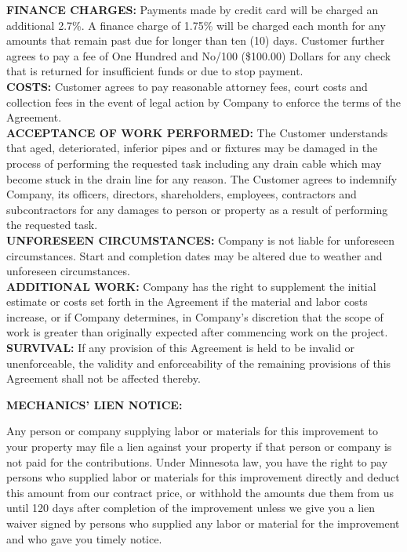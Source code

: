 \documentclass{article}
\begin{document}
\begin{footnotesize}
\noindent \textbf{FINANCE CHARGES:} Payments made by credit card will be charged an additional 2.7\%. A finance charge of 1.75\% will be charged each month for any amounts that remain past due for longer than ten (10) days. Customer further agrees to pay a fee of One Hundred and No/100 (\$100.00) Dollars for any check that is returned for insufficient funds or due to stop payment. \\

\noindent \textbf{COSTS:} Customer agrees to pay reasonable attorney fees, court costs and collection fees in the event of legal action by Company to enforce the terms of the Agreement. \\

\noindent \textbf{ACCEPTANCE OF WORK PERFORMED:} The Customer understands that aged, deteriorated, inferior pipes and or fixtures may be damaged in the process of performing the requested task including any drain cable which may become stuck in the drain line for any reason. The Customer agrees to indemnify Company, its officers, directors, shareholders, employees, contractors and subcontractors for any damages to person or property as a result of performing the requested task. \\

\noindent \textbf{UNFORESEEN CIRCUMSTANCES:} Company is not liable for unforeseen circumstances. Start and completion dates may be altered due to weather and unforeseen circumstances. \\

\noindent \textbf{ADDITIONAL WORK:} Company has the right to supplement the initial estimate or costs set forth in the Agreement if the material and labor costs increase, or if Company determines, in Company’s discretion that the scope of work is greater than originally expected after commencing work on the project.\\

\noindent \textbf{SURVIVAL:} If any provision of this Agreement is held to be invalid or unenforceable, the validity and enforceability of the remaining provisions of this Agreement shall not be affected thereby. \\

\begin{center}
    \textbf{MECHANICS’ LIEN NOTICE:}
\end{center}
Any person or company supplying labor or materials for this improvement to your property may file a lien against your property if that person or company is not paid for the contributions. Under Minnesota law, you have the right to pay persons who supplied labor or materials for this improvement directly and deduct this amount from our contract price, or withhold the amounts due them from us until 120 days after completion of the improvement unless we give you a lien waiver signed by persons who supplied any labor or material for the improvement and who gave you timely notice.

\end{footnotesize}
\end{document}

